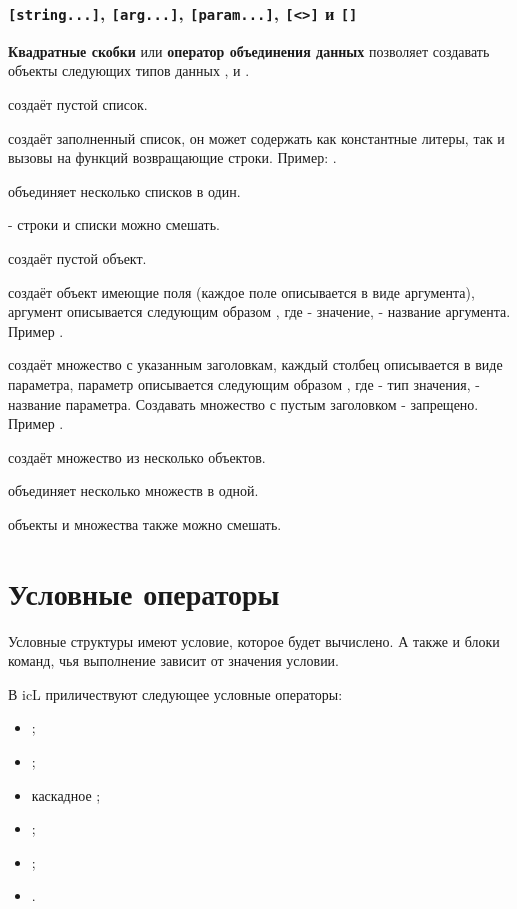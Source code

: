 \documentclass[a4paper, 14pt]{extarticle}
\newenvironment{icItems}
	{ \begin{itemize} [noitemsep,nolistsep] }
	{ \end{itemize} }
\begin{document}
\subsubsection{\lstinline`[string...]`, \lstinline`[arg...]`, \lstinline`[param...]`, \lstinline`[<>]` и \lstinline`[]`}

{\bf Квадратные скобки} или {\bf оператор объединения данных} позволяет создавать объекты следующих типов данных \listtype{}, \set{} и \object{}.

 создаёт пустой список.

 создаёт заполненный список, он может содержать как константные литеры, так и вызовы на функций возвращающие строки. Пример: \code{["a" "b" "c"]}.

 объединяет несколько списков в один.

 - строки и списки можно смешать.

 создаёт пустой объект.

 создаёт объект имеющие поля (каждое поле описывается в виде аргумента), аргумент описывается следующим образом , где  - значение,  - название аргумента. Пример .

 создаёт множество с указанным заголовкам, каждый столбец описывается в виде параметра, параметр описывается следующим образом , где  - тип значения,  - название параметра. Создавать множество с пустым заголовком - запрещено. Пример .

 создаёт множество из несколько объектов.

 объединяет несколько множеств в одной.

 объекты и множества также можно смешать.

\section{Условные операторы}

Условные структуры имеют условие, которое будет вычислено. А также и блоки команд, чья выполнение зависит от значения условии.

В icL приличествуют следующее условные операторы:
\begin{icItems}
	\item {};
	\item {};
	\item каскадное ;
	\item {};
	\item {};
	\item {}.
\end{icItems}
\end{document}
